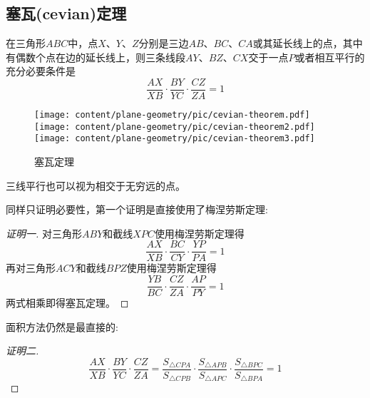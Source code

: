 \subsection{塞瓦(cevian)定理}
\label{sec:cevian-theorem}

\begin{theorem}[塞瓦定理]
  在三角形$ABC$中，点$X$、$Y$、$Z$分别是三边$AB$、$BC$、$CA$或其延长线上的点，其中有偶数个点在边的延长线上，则三条线段$AY$、$BZ$、$CX$交于一点$P$或者相互平行的充分必要条件是
  \begin{equation}
    \label{eq:cevian-theorem}
    \frac{AX}{XB} \cdot \frac{BY}{YC} \cdot \frac{CZ}{ZA} = 1
  \end{equation}
\end{theorem}
 
\begin{figure}[htbp]
\centering
\texttt{[image: content/plane-geometry/pic/cevian-theorem.pdf]}
\texttt{[image: content/plane-geometry/pic/cevian-theorem2.pdf]}
\texttt{[image: content/plane-geometry/pic/cevian-theorem3.pdf]}
\caption{塞瓦定理}
\label{fig:cevian-theorem}
\end{figure}

三线平行也可以视为相交于无穷远的点。

同样只证明必要性，第一个证明是直接使用了梅涅劳斯定理:
\begin{proof}[证明一]
  对三角形$ABY$和截线$XPC$使用梅涅劳斯定理得
  \begin{equation*}
    \frac{AX}{XB} \cdot \frac{BC}{CY} \cdot \frac{YP}{PA} = 1
  \end{equation*}
  再对三角形$ACY$和截线$BPZ$使用梅涅劳斯定理得
  \begin{equation*}
    \frac{YB}{BC} \cdot \frac{CZ}{ZA} \cdot \frac{AP}{PY} = 1
  \end{equation*}
  两式相乘即得塞瓦定理。
\end{proof}

面积方法仍然是最直接的:
\begin{proof}[证明二]
  \begin{equation*}
    \frac{AX}{XB} \cdot \frac{BY}{YC} \cdot \frac{CZ}{ZA} =
    \frac{S_{\triangle CPA}}{S_{\triangle CPB}} \cdot
    \frac{S_{\triangle APB}}{S_{\triangle APC}} \cdot
    \frac{S_{\triangle BPC}}{S_{\triangle BPA}} = 1
  \end{equation*}
\end{proof}

